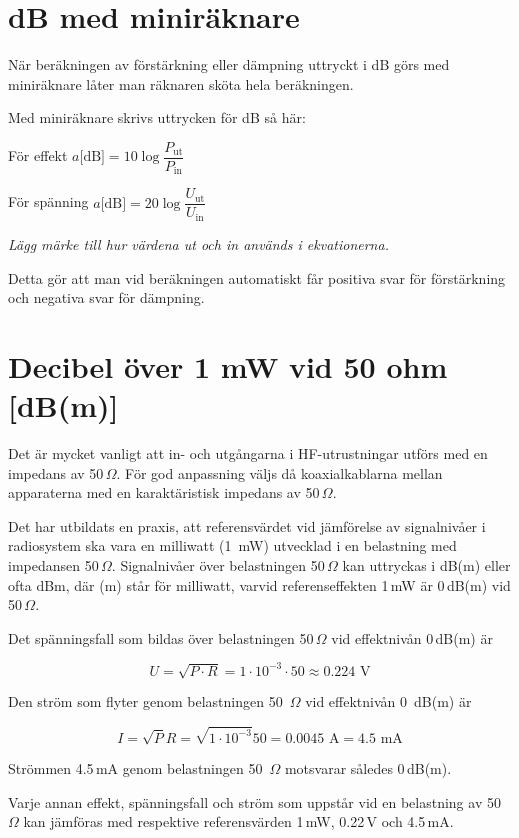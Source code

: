 \section{dB med miniräknare}

När beräkningen av förstärkning eller dämpning uttryckt i dB görs med
miniräknare låter man räknaren sköta hela beräkningen.

Med miniräknare skrivs uttrycken för dB så här:

För effekt \(a\text{[dB]} = 10\log \dfrac{P_\text{ut}}{P_\text{in}}\)

För spänning \(a\text{[dB]} = 20\log \dfrac{U_\text{ut}}{U_\text{in}}\)

\emph{Lägg märke till hur värdena ut och in används i ekvationerna.}

Detta gör att man vid beräkningen automatiskt får positiva svar för
förstärkning och negativa svar för dämpning.

\section{Decibel över 1 mW vid 50 ohm [dB(m)]}

Det är mycket vanligt att in- och utgångarna i HF-utrustningar utförs
med en impedans av 50\,\(\Omega\).
För god anpassning väljs då koaxialkablarna mellan apparaterna med en
karaktäristisk impedans av 50\,\(\Omega\).

Det har utbildats en praxis, att referensvärdet vid jämförelse av signalnivåer
i radiosystem ska vara en milliwatt (1~mW) utvecklad i en belastning med
impedansen 50\,\(\Omega\).
Signalnivåer över belastningen 50\,\(\Omega\) kan uttryckas i dB(m) eller ofta
dBm, där (m) står för milliwatt, varvid referenseffekten 1\,mW är 0\,dB(m) vid
50\,\(\Omega\).

Det spänningsfall som bildas över belastningen 50\,\(\Omega\) vid effektnivån
0\,dB(m) är

\[
	U = \sqrt{P\cdot R} = 1\cdot 10^{-3} \cdot 50 \approx 0.224 \text{ V}
\]

Den ström som flyter genom belastningen 50~\(\Omega\) vid effektnivån 0~dB(m)
är

\[
	I = \sqrt{P}{R} = \sqrt{1\cdot 10^{-3}}{50} = 0.0045 \text{ A} = 4.5 \text{ mA}
\]

Strömmen 4.5\,mA genom belastningen 50~\(\Omega\) motsvarar således 0\,dB(m).

Varje annan effekt, spänningsfall och ström som uppstår vid en
belastning av 50 \(\Omega\) kan jämföras med respektive referensvärden 1\,mW,
0.22\,V och 4.5\,mA.

